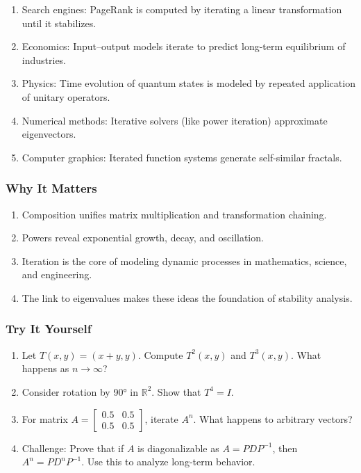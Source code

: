 \documentclass[
  letterpaper,
  DIV=11,
  numbers=noendperiod]{scrreprt}
\providecommand{\tightlist}{%
  \setlength{\itemsep}{0pt}\setlength{\parskip}{0pt}}
\begin{document}
\begin{enumerate}
\def\labelenumi{\arabic{enumi}.}
\tightlist
\item
  Search engines: PageRank is computed by iterating a linear
  transformation until it stabilizes.
\item
  Economics: Input--output models iterate to predict long-term
  equilibrium of industries.
\item
  Physics: Time evolution of quantum states is modeled by repeated
  application of unitary operators.
\item
  Numerical methods: Iterative solvers (like power iteration)
  approximate eigenvectors.
\item
  Computer graphics: Iterated function systems generate self-similar
  fractals.
\end{enumerate}

\subsubsection{Why It Matters}\label{why-it-matters-41}

\begin{enumerate}
\def\labelenumi{\arabic{enumi}.}
\tightlist
\item
  Composition unifies matrix multiplication and transformation chaining.
\item
  Powers reveal exponential growth, decay, and oscillation.
\item
  Iteration is the core of modeling dynamic processes in mathematics,
  science, and engineering.
\item
  The link to eigenvalues makes these ideas the foundation of stability
  analysis.
\end{enumerate}

\subsubsection{Try It Yourself}\label{try-it-yourself-44}

\begin{enumerate}
\def\labelenumi{\arabic{enumi}.}
\tightlist
\item
  Let \(T(x,y) = (x+y, y)\). Compute \(T^2(x,y)\) and \(T^3(x,y)\). What
  happens as \(n \to \infty\)?
\item
  Consider rotation by 90° in \(\mathbb{R}^2\). Show that \(T^4 = I\).
\item
  For matrix
  \(A = \begin{bmatrix} 0.5 & 0.5 \\ 0.5 & 0.5 \end{bmatrix}\), iterate
  \(A^n\). What happens to arbitrary vectors?
\item
  Challenge: Prove that if \(A\) is diagonalizable as \(A = PDP^{-1}\),
  then \(A^n = PD^nP^{-1}\). Use this to analyze long-term behavior.
\end{enumerate}
\end{document}
